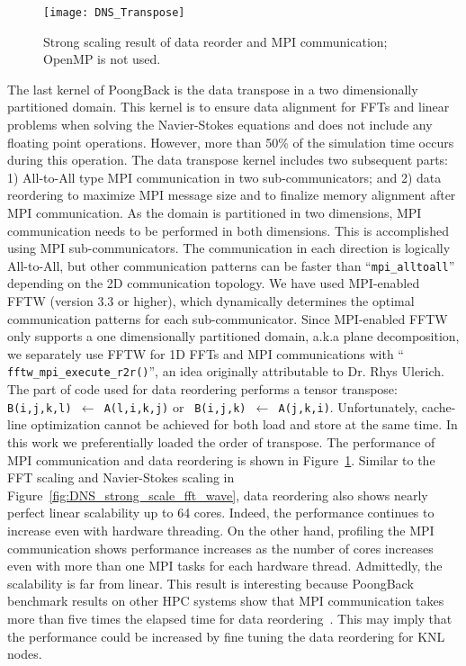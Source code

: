 \begin{figure}
 \begin{center}
   \texttt{[image: DNS\_Transpose]}
   \caption{Strong scaling result of data reorder and MPI communication; OpenMP is not used.}
   \label{fig:DNS_strong_scale_transpose}
 \end{center}
\end{figure}

The last kernel of PoongBack is the data transpose in a two dimensionally
partitioned domain. This kernel is to ensure data alignment for FFTs and
linear problems when solving the Navier-Stokes equations and does not include
any floating point operations. However, more than 50\% of the simulation
time occurs during this operation. The data transpose kernel includes two
subsequent parts: 1) All-to-All type MPI communication in two
sub-communicators; and 2) data reordering to maximize MPI message size
and to finalize memory alignment after MPI communication. As the
domain is partitioned in two dimensions, MPI communication needs to be
performed in both dimensions. This is accomplished using MPI sub-communicators.
The communication in each direction is logically All-to-All, but other communication
patterns can be faster than ``{\tt mpi\_alltoall}'' depending on the 2D
communication topology. We have used MPI-enabled FFTW (version 3.3 or
higher), which dynamically determines the optimal communication patterns for each
sub-communicator. Since MPI-enabled FFTW only supports a one dimensionally
partitioned domain, a.k.a plane decomposition, we separately use
FFTW for 1D FFTs and MPI communications with ``{\tt
fftw\_mpi\_execute\_r2r()}'', an idea originally attributable to Dr. Rhys
Ulerich.  The part of code used
for data reordering performs a tensor
transpose: {\tt B(i,j,k,l) $\leftarrow$ A(l,i,k,j)} or {\tt
B(i,j,k) $\leftarrow$ A(j,k,i)}. Unfortunately, cache-line
optimization cannot be achieved for both load and store at the same
time. In this work we preferentially loaded the order of transpose.
The performance of MPI communication and data reordering is
shown in Figure~\ref{fig:DNS_strong_scale_transpose}. Similar to the FFT
scaling and Navier-Stokes scaling in Figure~\ref{fig:DNS_strong_scale_fft_wave},
data reordering also shows nearly
perfect linear scalability up to 64 cores. Indeed, the performance
continues to increase even with hardware threading.
On the other hand, profiling the MPI communication shows performance
increases as the number of cores increases even with more than one
MPI tasks for each hardware thread. Admittedly, the scalability is far from
linear. This result is interesting because PoongBack benchmark results
on other HPC systems show that MPI communication takes more than five
times the elapsed time for data reordering~\cite{Lee:2013kv}. This
may imply that the performance could be increased by fine tuning
the data reordering for KNL nodes.

